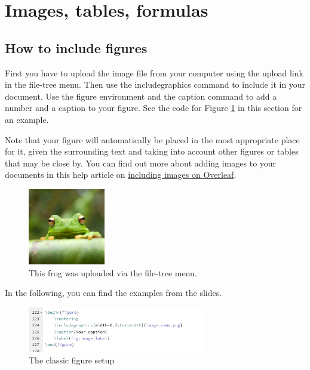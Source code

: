 \documentclass{article}
\begin{document}
\section{Images, tables, formulas}

\subsection{How to include figures}

First you have to upload the image file from your computer using the upload link in the file-tree menu. Then use the includegraphics command to include it in your document. Use the figure environment and the caption command to add a number and a caption to your figure. See the code for Figure \ref{fig:frog} in this section for an example.

Note that your figure will automatically be placed in the most appropriate place for it, given the surrounding text and taking into account other figures or tables that may be close by. You can find out more about adding images to your documents in this help article on \href{https://www.overleaf.com/learn/how-to/Including_images_on_Overleaf}{including images on Overleaf}.

\begin{figure}[H]
\centering
\includegraphics[width=0.3\textwidth]{frog.jpg}
\caption{\label{fig:frog}This frog was uploaded via the file-tree menu.}
\end{figure}

In the following, you can find the examples from the slides.

\begin{figure}[H]
    \centering
    \includegraphics[width=0.7\textwidth]{figure_setup.png}
    \caption{The classic figure setup}
    \label{fig:fig_inception}
\end{figure}  
\end{document}
